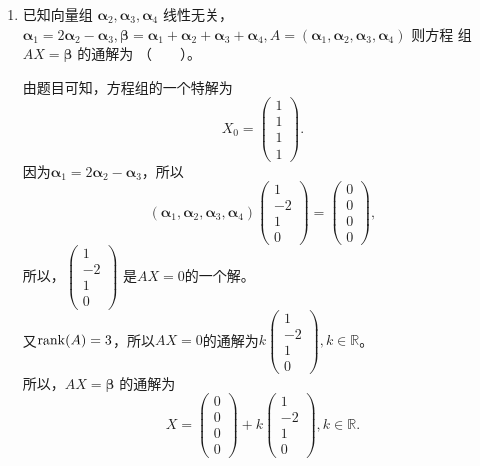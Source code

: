 \begin{enumerate}[1~]
\begin{enumerate}[1.~]
\item
已知向量组 $\boldsymbol{\alpha}_2, \boldsymbol{\alpha}_3, \boldsymbol{\alpha}_4$ 线性无关，$\boldsymbol{\alpha} _ { 1 } = 2 \boldsymbol{\alpha} _ { 2 } - \boldsymbol{\alpha} _ { 3 } , \boldsymbol{\beta} = \boldsymbol{\alpha} _ { 1 } + \boldsymbol{\alpha} _ { 2 } + \boldsymbol{\alpha} _ { 3 } + \boldsymbol{\alpha} _ { 4 } , A = \left( \boldsymbol{\alpha} _ { 1 } , \boldsymbol{\alpha} _ { 2 } , \boldsymbol{\alpha} _ { 3 } , \boldsymbol{\alpha} _ { 4 } \right)$ 则方程
组 $AX=\boldsymbol{\beta}$ 的通解为 （\ \ \ \ ）。
\begin{solution}
由题目可知，方程组的一个特解为\[
X_0 = \left( \begin{matrix}
1\\
1\\
1\\
1
\end{matrix} \right).
\]
因为$\boldsymbol{\alpha}_1 = 2 \boldsymbol{\alpha}_2 - \boldsymbol{\alpha}_3$，所以\[
(\boldsymbol{\alpha}_1, \boldsymbol{\alpha}_2, \boldsymbol{\alpha}_3, \boldsymbol{\alpha}_4) \left( \begin{matrix}
1\\
-2\\
1\\
0
\end{matrix} \right) =  \left( \begin{matrix}
0\\
0\\
0\\
0
\end{matrix} \right),
\]
所以，$\left( \begin{matrix}
1\\
-2\\
1\\
0
\end{matrix} \right)$ 是$AX = 0$的一个解。\\
又${\rm rank}(A) = 3$，所以$AX = 0$的通解为$k  \left( \begin{matrix}
1\\
-2\\
1\\
0
\end{matrix} \right), k \in \mathbb{R}$。\\
所以，$AX = \boldsymbol{\beta}$ 的通解为
\[
X =  \left( \begin{matrix}
0\\
0\\
0\\
0
\end{matrix} \right) + k  \left( \begin{matrix}
1\\
-2\\
1\\
0
\end{matrix} \right), k \in \mathbb{R}.
\]
\end{solution}



\end{enumerate}
\end{enumerate}

